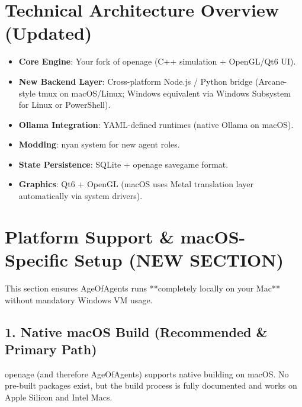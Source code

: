 \documentclass[11pt,a4paper]{article}
\begin{document}
\newpage
\section{Technical Architecture Overview (Updated)}

\begin{itemize}
    \item \textbf{Core Engine}: Your fork of openage (C++ simulation + OpenGL/Qt6 UI).
    \item \textbf{New Backend Layer}: Cross-platform Node.js / Python bridge (Arcane-style tmux on macOS/Linux; Windows equivalent via Windows Subsystem for Linux or PowerShell).
    \item \textbf{Ollama Integration}: YAML-defined runtimes (native Ollama on macOS).
    \item \textbf{Modding}: nyan system for new agent roles.
    \item \textbf{State Persistence}: SQLite + openage savegame format.
    \item \textbf{Graphics}: Qt6 + OpenGL (macOS uses Metal translation layer automatically via system drivers).
\end{itemize}

\section{Platform Support \& macOS-Specific Setup (NEW SECTION)}

This section ensures AgeOfAgents runs **completely locally on your Mac** without mandatory Windows VM usage.

\subsection{1. Native macOS Build (Recommended \& Primary Path)}
openage (and therefore AgeOfAgents) supports native building on macOS. No pre-built packages exist, but the build process is fully documented and works on Apple Silicon and Intel Macs.
\end{document}
